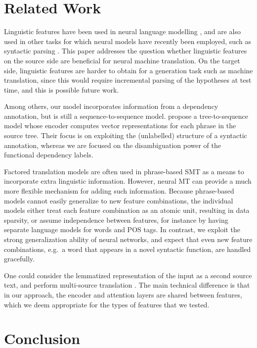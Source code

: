 \documentclass[11pt]{article}
\begin{document}
\section{Related Work}

Linguistic features have been used in neural language modelling \cite{alexandrescu-kirchhoff:2006:HLT-NAACL06-Short}, and are also used in other tasks for which neural models have recently been employed, such as syntactic parsing \cite{chen-manning:2014:EMNLP2014}.
This paper addresses the question whether linguistic features on the source side are beneficial for neural machine translation.
On the target side, linguistic features are harder to obtain for a generation task such as machine translation, since this would require incremental parsing of the hypotheses at test time, and this is possible future work.

Among others, our model incorporates information from a dependency annotation, but is still a sequence-to-sequence model.
 propose a tree-to-sequence model whose encoder computes vector representations for each phrase in the source tree.
Their focus is on exploiting the (unlabelled) structure of a syntactic annotation, whereas we are focused on the disambiguation power of the functional dependency labels.

Factored translation models are often used in  phrase-based SMT \cite{koehn-hoang:07} as a means to incorporate extra linguistic information. However, neural MT can provide a much more flexible
mechanism for adding such information.
Because phrase-based models cannot easily generalize to new feature combinations, the individual models either treat each feature combination as an atomic unit, resulting in data sparsity,
or assume independence between features, for instance by having separate language models for words and POS tags.
In contrast, we exploit the strong generalization ability of neural networks, and expect that even new feature combinations, e.g.\ a word that appears in a novel syntactic function, are handled gracefully.

One could consider the lemmatized representation of the input as a second source text, and perform multi-source translation \cite{2016arXiv160100710Z}.
The main technical difference is that in our approach, the encoder and attention layers are shared between features, which we deem appropriate for the types of features that we tested.

\section{Conclusion}
\end{document}
